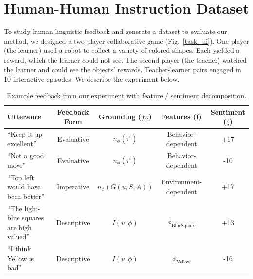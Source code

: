 \documentclass[letterpaper]{article} %
\begin{document}
\section{Human-Human Instruction Dataset}
\label{experiment_section}

To study human linguistic feedback and generate a dataset to evaluate our method, we designed a two-player collaborative game (Fig.~\ref{task_ui}). One player (the learner) used a robot to collect a variety of colored shapes. Each yielded a reward, which the learner could not see. The second player (the teacher) watched the learner and could see the objects' rewards. Teacher-learner pairs engaged in 10 interactive episodes. We describe the experiment below.

\begin{table}[h]
\begin{center} 
\vskip 0.12in
\begin{tabular}{lcccc}
\hline
Utterance   &  Feedback Form & Grounding ($f_G$) & Features (\textbf{f}) & Sentiment ($\zeta$)  \\
\hline
``Keep it up excellent'' & Evaluative & $n_\phi(\tau^i)$ & Behavior-dependent  & +17 \\
``Not a good move''  & Evaluative &  $n_\phi(\tau^i)$ & Behavior-dependent  & -10 \\
``Top left would have been better''  &  Imperative & $n_\phi(G(u, S, A))$ & Environment-dependent & +17 \\
``The light-blue squares are high valued'' & Descriptive & $I(u, \phi)$ & $\phi_{\text{BlueSquare}}$ & +13  \\
``I think Yellow is bad'' & Descriptive &  $I(u, \phi)$ & $\phi_\text{Yellow}$ & -16 \\
\hline
\end{tabular}
\caption{Example feedback from our experiment with feature / sentiment decomposition.}
\label{tab:experiment_language_example}
\end{center}
\end{table}
\end{document}

